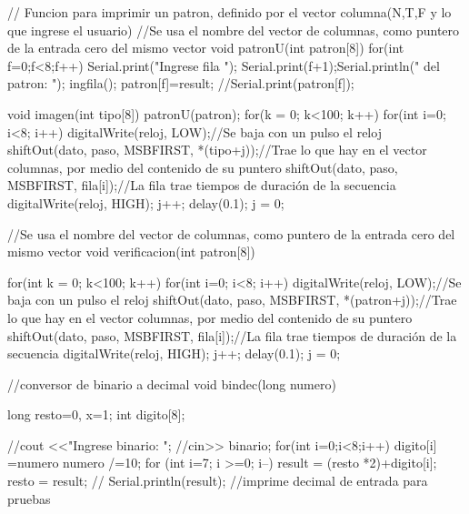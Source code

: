 \documentclass{article}
\begin{document}
// Funcion para imprimir un patron, definido por el vector columna(N,T,F y lo que ingrese el usuario)
//Se usa el nombre del vector de columnas, como puntero de la entrada cero del mismo vector
void patronU(int patron[8]){
  for(int f=0;f<8;f++)
  {
    Serial.print("Ingrese fila "); Serial.print(f+1);Serial.println(" del patron: ");
  	ingfila();
    patron[f]=result;
    //Serial.print(patron[f]);
  }
}

void imagen(int tipo[8])
{
  patronU(patron);
  for(k = 0; k<100; k++)
  {
    for(int i=0; i<8; i++)
    {
      digitalWrite(reloj, LOW);//Se baja con un pulso el reloj
      shiftOut(dato, paso, MSBFIRST, *(tipo+j));//Trae lo que hay en el vector columnas, por medio del contenido de su puntero
      shiftOut(dato, paso, MSBFIRST, fila[i]);//La fila trae tiempos de duración de la secuencia
      digitalWrite(reloj, HIGH);
      j++;
    delay(0.1);  
    }
    j = 0;
  }
 }

//Se usa el nombre del vector de columnas, como puntero de la entrada cero del mismo vector
void verificacion(int patron[8])
{
 for(int k = 0; k<100; k++)
  {
    for(int i=0; i<8; i++)
    {
      digitalWrite(reloj, LOW);//Se baja con un pulso el reloj
      shiftOut(dato, paso, MSBFIRST, *(patron+j));//Trae lo que hay en el vector columnas, por medio del contenido de su puntero
      shiftOut(dato, paso, MSBFIRST, fila[i]);//La fila trae tiempos de duración de la secuencia
      digitalWrite(reloj, HIGH);
      j++;
    delay(0.1);  
    }
    j = 0;
 }
  
}
//conversor de binario a decimal
void bindec(long numero){
    long resto=0, x=1;
    int digito[8];
  
    //cout <<"Ingrese binario: ";
    //cin>> binario;
    for(int i=0;i<8;i++){
        digito[i] =numero%
        numero /=10;
    }
    for (int i=7; i >=0; i--){
        result = (resto *2)+digito[i];
        resto = result;
     }
       // Serial.println(result); //imprime decimal de entrada para pruebas
 }            
\end{document}
